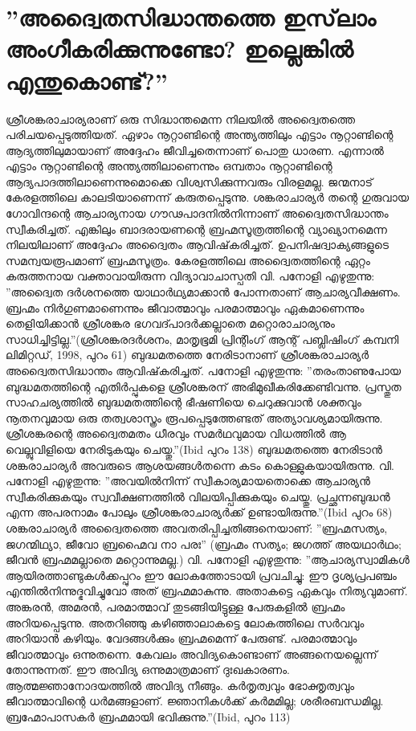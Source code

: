   \section{''അദ്വൈതസിദ്ധാന്തത്തെ ഇസ്‌ലാം അംഗീകരിക്കുന്നുണ്ടോ? ഇല്ലെങ്കില്‍ എന്തുകൊണ്ട്?''}
 ശ്രീശങ്കരാചാര്യരാണ് ഒരു സിദ്ധാന്തമെന്ന നിലയില്‍ അദ്വൈതത്തെ പരിചയപ്പെടുത്തിയത്. ഏഴാം നൂറ്റാണ്ടിന്റെ അന്ത്യത്തിലും എട്ടാം നൂറ്റാണ്ടിന്റെ ആദ്യത്തിലുമായാണ് അദ്ദേഹം ജീവിച്ചതെന്നാണ് പൊതു ധാരണ. എന്നാല്‍ എട്ടാം നൂറ്റാണ്ടിന്റെ അന്ത്യത്തിലാണെന്നും ഒമ്പതാം നൂറ്റാണ്ടിന്റെ ആദ്യപാദത്തിലാണെന്നുമൊക്കെ വിശ്വസിക്കുന്നവരും വിരളമല്ല. ജന്മനാട് കേരളത്തിലെ കാലടിയാണെന്ന് കരുതപ്പെടുന്നു. ശങ്കരാചാര്യര്‍ തന്റെ ഗുരുവായ ഗോവിന്ദന്റെ ആചാര്യനായ ഗൗഢപാദനില്‍നിന്നാണ് അദ്വൈതസിദ്ധാന്തം സ്വീകരിച്ചത്. എങ്കിലും ബാദരായണന്റെ ബ്രഹ്മസൂത്രത്തിന്റെ വ്യാഖ്യാനമെന്ന നിലയിലാണ് അദ്ദേഹം അദ്വൈതം ആവിഷ്‌കരിച്ചത്. ഉപനിഷദ്വാക്യങ്ങളുടെ സമന്വയരൂപമാണ് ബ്രഹ്മസൂത്രം.
കേരളത്തിലെ അദ്വൈതത്തിന്റെ ഏറ്റം കരുത്തനായ വക്താവായിരുന്ന വിദ്യാവാചാസ്പതി വി. പനോളി എഴുതുന്നു: ''അദ്വൈത ദര്‍ശനത്തെ യാഥാര്‍ഥ്യമാക്കാന്‍ പോന്നതാണ് ആചാര്യവീക്ഷണം. ബ്രഹ്മം നിര്‍ഗുണമാണെന്നും ജീവാത്മാവും പരമാത്മാവും ഏകമാണെന്നും തെളിയിക്കാന്‍ ശ്രീശങ്കര ഭഗവദ്പാദര്‍ക്കല്ലാതെ മറ്റൊരാചാര്യനും സാധിച്ചിട്ടില്ല.''(ശ്രീശങ്കരദര്‍ശനം, മാതൃഭൂമി പ്രിന്റിംഗ് ആന്റ് പബ്ലിഷിംഗ് കമ്പനി ലിമിറ്റഡ്, 1998, പുറം 61)
ബുദ്ധമതത്തെ നേരിടാനാണ് ശ്രീശങ്കരാചാര്യര്‍ അദ്വൈതസിദ്ധാന്തം ആവിഷ്‌കരിച്ചത്. പനോളി എഴുതുന്നു: ''തരംതാണുപോയ ബുദ്ധമതത്തിന്റെ എതിര്‍പ്പുകളെ ശ്രീശങ്കരന് അഭിമുഖീകരിക്കേണ്ടിവന്നു. പ്രസ്തുത സാഹചര്യത്തില്‍ ബുദ്ധമതത്തിന്റെ ഭീഷണിയെ ചെറുക്കുവാന്‍ ശക്തവും നൂതനവുമായ ഒരു തത്വശാസ്ത്രം രൂപപ്പെടുത്തേണ്ടത് അത്യാവശ്യമായിരുന്നു. ശ്രീശങ്കരന്റെ അദ്വൈതമതം ധീരവും സമര്‍ഥവുമായ വിധത്തില്‍ ആ വെല്ലുവിളിയെ നേരിടുകയും ചെയ്തു.''(Ibid പുറം 138)
ബുദ്ധമതത്തെ നേരിടാന്‍ ശങ്കരാചാര്യര്‍ അവരുടെ ആശയങ്ങള്‍തന്നെ കടം കൊള്ളുകയായിരുന്നു. വി. പനോളി എഴുതുന്നു: ''അവയില്‍നിന്ന് സ്വീകാര്യമായതൊക്കെ ആചാര്യന്‍ സ്വീകരിക്കുകയും സ്വവീക്ഷണത്തില്‍ വിലയിപ്പിക്കുകയും ചെയ്തു. പ്രച്ഛന്നബുദ്ധന്‍ എന്ന അപരനാമം പോലും ശ്രീശങ്കരാചാര്യര്‍ക്ക് ഉണ്ടായിരുന്നു.''(Ibid പുറം 68)
ശങ്കരാചാര്യര്‍ അദ്വൈതത്തെ അവതരിപ്പിച്ചതിങ്ങനെയാണ്: ''ബ്രഹ്മസത്യം, ജഗന്മിഥ്യാ, ജീവോ ബ്രഹ്മൈവ നാ പരഃ''
(ബ്രഹ്മം സത്യം; ജഗത്ത് അയഥാര്‍ഥം; ജീവന്‍ ബ്രഹ്മമല്ലാതെ മറ്റൊന്നുമല്ല.)
വി. പനോളി എഴുതുന്നു: ''ആചാര്യസ്വാമികള്‍ ആയിരത്താണ്ടുകള്‍ക്കപ്പുറം ഈ ലോകത്തോടായി പ്രവചിച്ചു: ഈ ദൃശ്യപ്രപഞ്ചം എന്തില്‍നിന്നുദ്ഭവിച്ചുവോ അത് ബ്രഹ്മമാകുന്നു. അതാകട്ടെ ഏകവും നിത്യവുമാണ്. അങ്കരന്‍, അമരന്‍, പരമാത്മാവ് തുടങ്ങിയിട്ടുള്ള പേരുകളില്‍ ബ്രഹ്മം അറിയപ്പെടുന്നു. അതറിഞ്ഞു കഴിഞ്ഞാലാകട്ടെ ലോകത്തിലെ സര്‍വവും അറിയാന്‍ കഴിയും. വേദങ്ങള്‍ക്കും ബ്രഹ്മമെന്ന് പേരുണ്ട്. പരമാത്മാവും ജീവാത്മാവും ഒന്നുതന്നെ. കേവലം അവിദ്യകൊണ്ടാണ് അങ്ങനെയല്ലെന്ന് തോന്നുന്നത്. ഈ അവിദ്യ ഒന്നുമാത്രമാണ് ദുഃഖകാരണം. ആത്മജ്ഞാനോദയത്തില്‍ അവിദ്യ നീങ്ങും. കര്‍തൃത്വവും ഭോക്തൃത്വവും ജീവാത്മാവിന്റെ ധര്‍മങ്ങളാണ്. ജ്ഞാനികള്‍ക്ക് കര്‍മമില്ല; ശരീരബന്ധമില്ല. ബ്രഹ്മോപാസകര്‍ ബ്രഹ്മമായി ഭവിക്കുന്നു.''(Ibid, പുറം 113)
